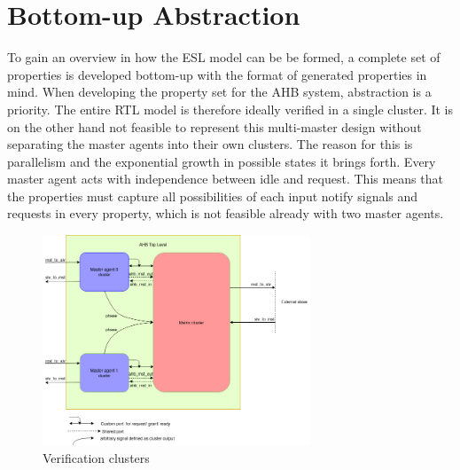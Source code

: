 \label{ch:design}

\section{Bottom-up Abstraction}
\label{sec:bottom-up}
To gain an overview in how the ESL model can be be formed, a complete set of properties is developed bottom-up with the format of generated properties in mind.
When developing the property set for the AHB system, abstraction is a priority. The entire RTL model is therefore ideally verified in a single cluster. 
It is on the other hand not feasible to represent this multi-master design without separating the master agents into their own clusters. The reason for this is 
parallelism and the exponential growth in possible states it brings forth. Every master agent acts with independence between idle and request. This means that the properties must capture all possibilities of each input notify signals and requests in every property, which is not feasible already with two master agents.
\begin{figure}
\includegraphics[width=8cm]{figs/Verif/Verif_block.png}
\caption{Verification clusters}\label{fig:verif-clust}
\end{figure} 


